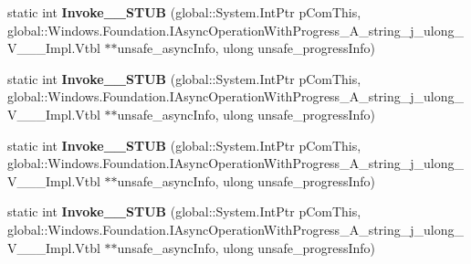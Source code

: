 \begin{DoxyCompactItemize}
\item 
\mbox{\label{struct_windows_1_1_foundation_1_1_async_operation_progress_handler___a__string__j__ulong___v_______impl_1_1_vtbl_a686fb967b2fd321781aac86ac6ffb2c2}} 
static int {\bfseries Invoke\+\_\+\+\_\+\+S\+T\+UB} (global\+::\+System.\+Int\+Ptr p\+Com\+This, global\+::\+Windows.\+Foundation.\+I\+Async\+Operation\+With\+Progress\+\_\+\+A\+\_\+string\+\_\+j\+\_\+ulong\+\_\+\+V\+\_\+\+\_\+\+\_\+\+Impl.\+Vtbl $\ast$$\ast$unsafe\+\_\+async\+Info, ulong unsafe\+\_\+progress\+Info)
\item 
\mbox{\label{struct_windows_1_1_foundation_1_1_async_operation_progress_handler___a__string__j__ulong___v_______impl_1_1_vtbl_a686fb967b2fd321781aac86ac6ffb2c2}} 
static int {\bfseries Invoke\+\_\+\+\_\+\+S\+T\+UB} (global\+::\+System.\+Int\+Ptr p\+Com\+This, global\+::\+Windows.\+Foundation.\+I\+Async\+Operation\+With\+Progress\+\_\+\+A\+\_\+string\+\_\+j\+\_\+ulong\+\_\+\+V\+\_\+\+\_\+\+\_\+\+Impl.\+Vtbl $\ast$$\ast$unsafe\+\_\+async\+Info, ulong unsafe\+\_\+progress\+Info)
\item 
\mbox{\label{struct_windows_1_1_foundation_1_1_async_operation_progress_handler___a__string__j__ulong___v_______impl_1_1_vtbl_a686fb967b2fd321781aac86ac6ffb2c2}} 
static int {\bfseries Invoke\+\_\+\+\_\+\+S\+T\+UB} (global\+::\+System.\+Int\+Ptr p\+Com\+This, global\+::\+Windows.\+Foundation.\+I\+Async\+Operation\+With\+Progress\+\_\+\+A\+\_\+string\+\_\+j\+\_\+ulong\+\_\+\+V\+\_\+\+\_\+\+\_\+\+Impl.\+Vtbl $\ast$$\ast$unsafe\+\_\+async\+Info, ulong unsafe\+\_\+progress\+Info)
\item 
\mbox{\label{struct_windows_1_1_foundation_1_1_async_operation_progress_handler___a__string__j__ulong___v_______impl_1_1_vtbl_a686fb967b2fd321781aac86ac6ffb2c2}} 
static int {\bfseries Invoke\+\_\+\+\_\+\+S\+T\+UB} (global\+::\+System.\+Int\+Ptr p\+Com\+This, global\+::\+Windows.\+Foundation.\+I\+Async\+Operation\+With\+Progress\+\_\+\+A\+\_\+string\+\_\+j\+\_\+ulong\+\_\+\+V\+\_\+\+\_\+\+\_\+\+Impl.\+Vtbl $\ast$$\ast$unsafe\+\_\+async\+Info, ulong unsafe\+\_\+progress\+Info)

\end{DoxyCompactItemize}
